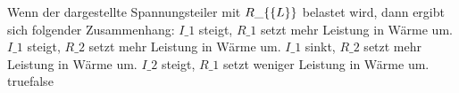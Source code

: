     {Wenn der dargestellte Spannungsteiler mit $R\_\{\textrm\{L\}\}$ belastet wird, dann ergibt sich folgender Zusammenhang:}
    {$I\_1$ steigt, $R\_1$ setzt mehr Leistung in Wärme um.}
    {$I\_1$ steigt, $R\_2$ setzt mehr Leistung in Wärme um.}
    {$I\_1$ sinkt, $R\_2$ setzt mehr Leistung in Wärme um.}
    {$I\_2$ steigt, $R\_1$ setzt weniger Leistung in Wärme um.}
    {true}{false}